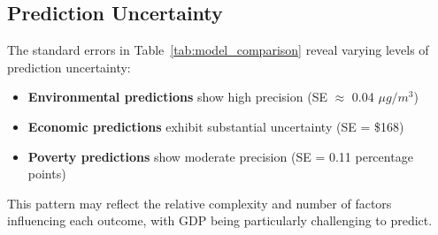\subsection{Prediction Uncertainty}

The standard errors in Table~\ref{tab:model_comparison} reveal varying levels of prediction uncertainty:

\begin{itemize}
    \item \textbf{Environmental predictions} show high precision (SE $\approx$ 0.04 $\mu g/m^3$)
    \item \textbf{Economic predictions} exhibit substantial uncertainty (SE = \$168)
    \item \textbf{Poverty predictions} show moderate precision (SE = 0.11 percentage points)
\end{itemize}

This pattern may reflect the relative complexity and number of factors influencing each outcome, with GDP being particularly challenging to predict.